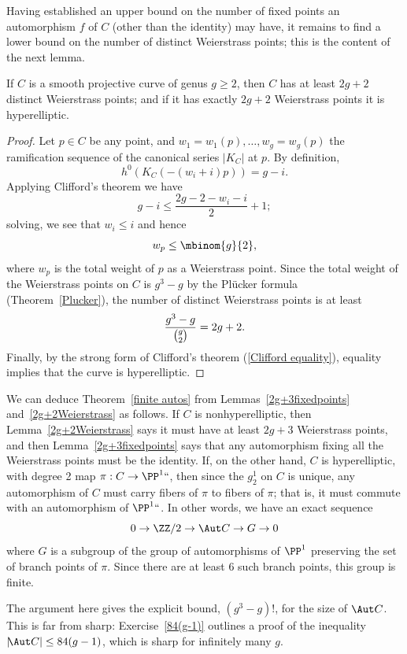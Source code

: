 Having established an upper  bound on the number of fixed points an
automorphism $f$ of $C$ (other than the identity) may have, it remains
to find a lower bound on the number of distinct Weierstrass points;
this is the content of the next lemma.


\begin{lemma}\label{2g+2Weierstrass}
If $C$ is a smooth projective curve of genus $g \geq 2$, then $C$ has at
least $2g+2$ distinct Weierstrass points; and if it has exactly $2g+2$
%
%
Weierstrass points it is
hyperelliptic.
\end{lemma}

\begin{proof}
Let $p \in C$ be any point, and $w_1=w_1(p),\dots,w_g = w_g(p)$
the ramification sequence of the canonical series $|K_C|$ at $p$. By
definition,
$$
h^0(K_C(-(w_i+i)p)) = g - i.
$$
Applying Clifford's theorem we have
$$
g-i \leq \frac{2g - 2 - w_i - i}{2} + 1;
$$
solving, we see that
$
w_i \leq i
$
and hence
$$
w_p \leq \mbinom{g}{2}
,
$$
where $w_p$ is the total weight of $p$ as a Weierstrass point. Since the
total weight of the Weierstrass points on $C$ is $g^3-g$ by the Pl\"ucker
formula (Theorem~\ref{Plucker}), the number of distinct Weierstrass points
is at least
$$
\frac{g^3-g}{\tbinom{g}{2}} = 2g+2.
$$
Finally, by the strong form of
Clifford's theorem
%
(\ref{Clifford
equality}), equality implies that the curve is hyperelliptic.
\end{proof}

We can deduce Theorem~\ref{finite autos} from Lemmas~\ref{2g+3fixedpoints}
and~\ref{2g+2Weierstrass} as follows. If $C$ is
nonhyperelliptic,
then
%
Lemma~\ref{2g+2Weierstrass} says it must have at least $2g+3$ Weierstrass
points, and then Lemma~\ref{2g+3fixedpoints} says that any automorphism
fixing all the Weierstrass points must be the identity. If, on the other
%
hand, $C$ is hyperelliptic, with degree 2 map $\pi : C \to \PP^1` `$,
then since the $g^1_2$ on $C$ is unique, any automorphism of $C$ must
carry fibers of $\pi$ to fibers of $\pi$; that is, it must commute with
an automorphism of $\PP^1` `$. In other words, we have an exact sequence
$$
0 \to \ZZ/2 \to \Aut C \to G \to 0
$$
where $G$ is a subgroup of the group of automorphisms of $\PP^1$
preserving  the set of branch points of $\pi$. Since there are at least
6 such branch points, this group is finite.

The argument here gives the explicit bound,
$(g^3-g)!$,
for the size
of $\Aut C$. This is far from sharp:
Exercise~\ref{84(g-1)}
outlines a proof of
the inequality
$|\!\Aut C| \leq 84(g-1)$, which is
sharp for infinitely many $g$.

